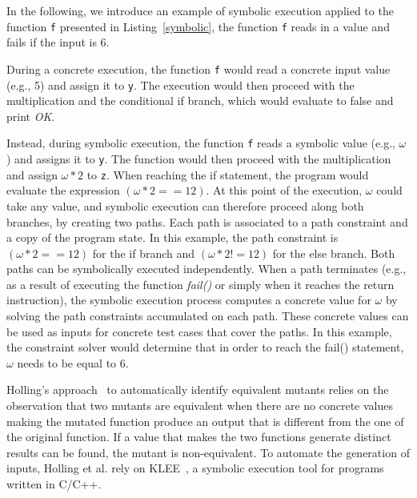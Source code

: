 In the following, we introduce an example of symbolic execution applied to the function \texttt{f} presented in Listing~\ref{symbolic}, the function \texttt{f} reads in a value and fails if the input is 6.



During a concrete execution, the function \texttt{f} would read a concrete input value (e.g., 5) and assign it to \texttt{y}. The execution would then proceed with the multiplication and the conditional if branch, which would evaluate to false and print \emph{OK}.

Instead, during symbolic execution, the function \texttt{f} reads a symbolic value (e.g., $\omega$) and assigns it to \texttt{y}. The function would then proceed with the multiplication and assign $\omega * 2$ to \texttt{z}. When reaching the if statement, the program would evaluate the expression $(\omega * 2 == 12)$. 
At this point of the execution, $\omega$ could take any value, and symbolic execution can therefore proceed along both branches, by creating two paths. 
Each path is associated to a path constraint and a copy of the program state.
In this example, the path constraint is $(\omega * 2 == 12)$ for the if branch and $(\omega * 2 != 12)$ for the else branch. 
Both paths can be symbolically executed independently. When a path terminates (e.g., as a result of executing the function \emph{fail()} or simply when it reaches the return instruction), the symbolic execution process computes a concrete value for $\omega$ by solving the path constraints accumulated on each path. 
These concrete values can be used as inputs for concrete test cases that cover the paths. In this example, the constraint solver would determine that in order to reach the fail() statement, $\omega$ needs to be equal to 6.

Holling's approach~\cite{holling2016nequivack} to automatically identify equivalent mutants relies on the observation that 
two mutants are equivalent when there are no concrete values making the mutated function produce an output that is different from the one of the original function.
If a value that makes the two functions generate distinct results can be found, the mutant is non-equivalent.
To automate the generation of inputs, Holling et al. rely on KLEE~\cite{cadar2008klee}, a symbolic execution tool for programs written in C/C++.


